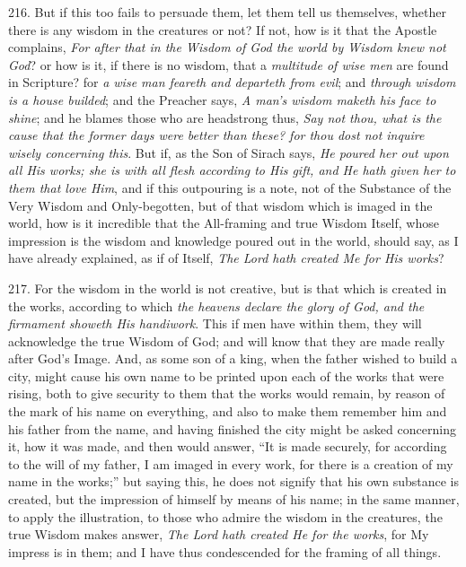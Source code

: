 216. But if this too fails to
persuade them, let them tell us themselves, whether there is any
wisdom in the creatures or not? If not, how is it that the Apostle
complains, \emph{For after that in the Wisdom of God the world by Wisdom
knew not God}? or how is it, if there is no wisdom, that a \emph{multitude
of wise men} are found in Scripture? for \emph{a wise man feareth and
departeth from evil}; and \emph{through wisdom is a house builded};
and the Preacher says, \emph{A man's wisdom maketh his face to shine};
and he blames those who are headstrong thus, \emph{Say not thou, what is
the cause that the former days were better than these? for thou dost
not inquire wisely concerning this}. But if, as the Son of Sirach
says, \emph{He poured her out upon all His works; she is with all flesh
according to His gift, and He hath given her to them that love Him},
and if this outpouring is a note, not of the Substance of the Very
Wisdom and Only-begotten, but of that wisdom which is imaged in the
world, how is it incredible that the All-framing and true Wisdom
Itself, whose impression is the wisdom and knowledge poured out in the
world, should say, as I have already explained, as if of Itself, \emph{The
Lord hath created Me for His works}?

217. For the wisdom in the
world is not creative, but is that which is created in the works,
according to which \emph{the heavens declare the glory of God, and the
firmament showeth His handiwork}. This if men have within them,
they will acknowledge the true Wisdom of God; and will know that they
are made really after God's Image. And, as some son of a king, when
the father wished to build a city, might cause his own name to be
printed upon each of the works that were rising, both to give security
to them that the works would remain, by reason of the mark of
his name on everything, and also to make them remember him and his
father from the name, and having finished the city might be asked
concerning it, how it was made, and then would answer, ``It is made
securely, for according to the will of my father, I am imaged in every
work, for there is a creation of my name in the works;'' but saying
this, he does not signify that his own substance is created, but the
impression of himself by means of his name; in the same manner, to
apply the illustration, to those who admire the wisdom in the
creatures, the true Wisdom makes answer, \emph{The Lord hath created He
for the works}, for My impress is in them; and I have thus
condescended for the framing of all things.

